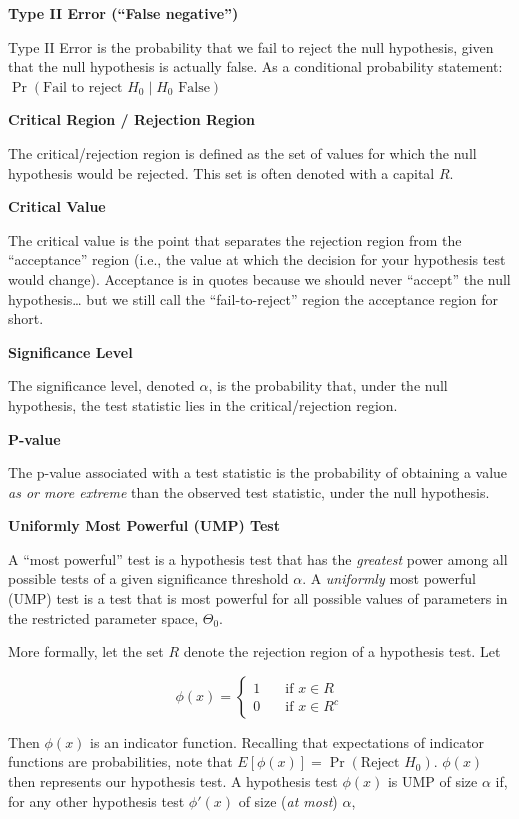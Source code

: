 \documentclass[
  letterpaper,
  DIV=11,
  numbers=noendperiod]{scrreprt}
\begin{document}
\textbf{Type II Error (``False negative'')}

Type II Error is the probability that we fail to reject the null
hypothesis, given that the null hypothesis is actually false. As a
conditional probability statement:
\(\Pr(\text{Fail to reject }H_0 \mid H_0 \text{ False})\)

\textbf{Critical Region / Rejection Region}

The critical/rejection region is defined as the set of values for which
the null hypothesis would be rejected. This set is often denoted with a
capital \(R\).

\textbf{Critical Value}

The critical value is the point that separates the rejection region from
the ``acceptance'' region (i.e., the value at which the decision for
your hypothesis test would change). Acceptance is in quotes because we
should never ``accept'' the null hypothesis\ldots{} but we still call
the ``fail-to-reject'' region the acceptance region for short.

\textbf{Significance Level}

The significance level, denoted \(\alpha\), is the probability that,
under the null hypothesis, the test statistic lies in the
critical/rejection region.

\textbf{P-value}

The p-value associated with a test statistic is the probability of
obtaining a value \emph{as or more extreme} than the observed test
statistic, under the null hypothesis.

\textbf{Uniformly Most Powerful (UMP) Test}

A ``most powerful'' test is a hypothesis test that has the
\emph{greatest} power among all possible tests of a given significance
threshold \(\alpha\). A \emph{uniformly} most powerful (UMP) test is a
test that is most powerful for all possible values of parameters in the
restricted parameter space, \(\Theta_0\).

More formally, let the set \(R\) denote the rejection region of a
hypothesis test. Let

\[
\phi(x) = \begin{cases} 1 & \quad \text{if } x \in R \\ 0 & \quad \text{if } x \in R^c \end{cases}
\]

Then \(\phi(x)\) is an indicator function. Recalling that expectations
of indicator functions are probabilities, note that
\(E[\phi(x)] = \Pr(\text{Reject } H_0)\). \(\phi(x)\) then represents
our hypothesis test. A hypothesis test \(\phi(x)\) is UMP of size
\(\alpha\) if, for any other hypothesis test \(\phi'(x)\) of size
(\emph{at most}) \(\alpha\),
\end{document}
